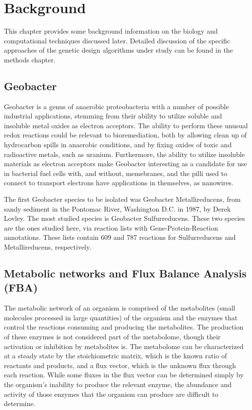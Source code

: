 \chapter{Background}
This chapter provides some background information on the biology and computational techniques discussed later. 
Detailed discussion of the specific approaches of the genetic design algorithms under study can be found in the methods chapter.

\section{Geobacter}
Geobacter is a genus of anaerobic proteobacteria with a number of possible industrial applications, stemming from their ability to utilize soluble and insoluble metal oxides as electron acceptors. 
The ability to perform these unusual redox reactions could be relevant to bioremediation, both by allowing clean up of hydrocarbon spills in anaerobic conditions, and by fixing oxides of toxic and radioactive metals, such as uranium. 
Furthermore, the ability to utilize insoluble materials as electron acceptors make Geobacter interesting as a candidate for use in bacterial fuel cells with, and without, memebranes, and the pilli used to connect to transport electrons have applications in themselves, as nanowires.

The first Geobacter species to be isolated was Geobacter Metallireducens, from sandy sediment in the Pontomac River, Washington D.C. in 1987, by Derek Lovley. 
The most studied species is Geobacter Sulfurreducens.
These two species are the ones studied here, via reaction lists with Gene-Protein-Reaction annotations.
These lists contain 609 and 787 reactions for Sulfurreducens and Metallireducens, respectively.

\section{Metabolic networks and Flux Balance Analysis (FBA)}
The metabolic network of an organism is comprised of the metabolites (small molecules processed in large quantities) of the organism and the enzymes that control the reactions consuming and producing the metabolites. 
The production of these enzymes is not considered part of the metabolome, though their activation or inhibition by metabolites is. 
The metabolome can be characterized at a steady state by the stoichiometric matrix, which is the known ratio of reactants and products, and a flux vector, which is the unknown flux through each reaction. 
While some fluxes in the flux vector can be determined simply by the organism's inability to produce the relevant enzyme, the abundance and activity of those enzymes that the organism can produce are difficult to determine. 

